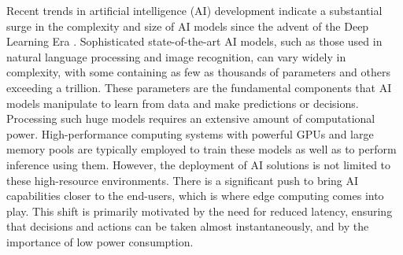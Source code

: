 Recent trends in artificial intelligence (AI) development indicate a substantial surge in the complexity and size of AI models since the advent of the Deep Learning Era \autocite{EpochDatabaseVisualization}.
Sophisticated state-of-the-art AI models, such as those used in natural language processing and image recognition, can vary widely in complexity, with some containing as few as thousands of parameters and others exceeding a trillion.
These parameters are the fundamental components that AI models manipulate to learn from data and make predictions or decisions.
Processing such huge models requires an extensive amount of computational power.
High-performance computing systems with powerful GPUs and large memory pools are typically employed to train these models as well as to perform inference using them.
However, the deployment of AI solutions is not limited to these high-resource environments.
There is a significant push to bring AI capabilities closer to the end-users, which is where edge computing comes into play.
This shift is primarily motivated by the need for reduced latency, ensuring that decisions and actions can be taken almost instantaneously, and by the importance of low power consumption.


